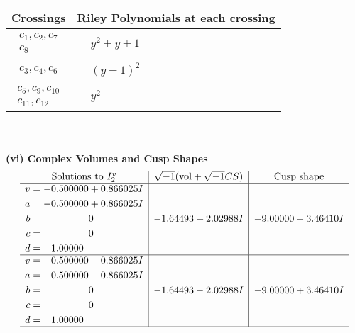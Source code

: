 \documentclass[1p]{elsarticle_modified}
\theoremstyle{definition}
\newcommand{\I}{\sqrt{-1}}
\begin{document}
\begin{tabular}{m{50pt}|m{274pt}}
Crossings & \hspace{64pt}Riley Polynomials at each crossing \\
\hline $$\begin{aligned}c_{1},c_{2},c_{7}\\c_{8}\end{aligned}$$&$\begin{aligned}
&y^2+y+1
\end{aligned}$\\
\hline $$\begin{aligned}c_{3},c_{4},c_{6}\end{aligned}$$&$\begin{aligned}
&(y-1)^2
\end{aligned}$\\
\hline $$\begin{aligned}c_{5},c_{9},c_{10}\\c_{11},c_{12}\end{aligned}$$&$\begin{aligned}
&y^2
\end{aligned}$\\
\hline
\end{tabular}\\~\\
\newpage\flushleft \textbf{(vi) Complex Volumes and Cusp Shapes}
$$\begin{array}{c|c|c}  
\text{Solutions to }I^v_{2}& \I (\text{vol} + \sqrt{-1}CS) & \text{Cusp shape}\\
 \hline 
\begin{aligned}
v &= -0.500000 + 0.866025 I \\
a &= -0.500000 + 0.866025 I \\
b &= \phantom{-0.000000 } 0 \\
c &= \phantom{-0.000000 } 0 \\
d &= \phantom{-}1.00000\phantom{ +0.000000I}\end{aligned}
 & -1.64493 + 2.02988 I & -9.00000 - 3.46410 I \\ \hline\begin{aligned}
v &= -0.500000 - 0.866025 I \\
a &= -0.500000 - 0.866025 I \\
b &= \phantom{-0.000000 } 0 \\
c &= \phantom{-0.000000 } 0 \\
d &= \phantom{-}1.00000\phantom{ +0.000000I}\end{aligned}
 & -1.64493 - 2.02988 I & -9.00000 + 3.46410 I\\
 \hline 
 \end{array}$$\newpage\newpage\renewcommand{\arraystretch}{1}
\end{document}

